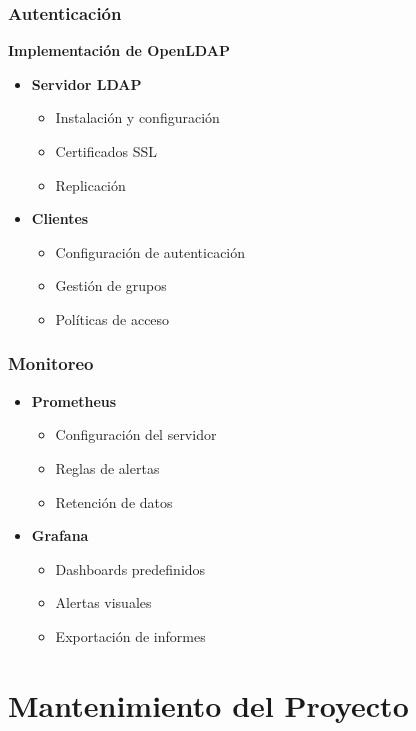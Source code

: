 \subsection{Autenticación}
\begin{infocaja}
\textbf{Implementación de OpenLDAP}
\begin{itemize}
    \item \textbf{Servidor LDAP}
    \begin{itemize}
        \item Instalación y configuración
        \item Certificados SSL
        \item Replicación
    \end{itemize}
    \item \textbf{Clientes}
    \begin{itemize}
        \item Configuración de autenticación
        \item Gestión de grupos
        \item Políticas de acceso
    \end{itemize}
\end{itemize}
\end{infocaja}

\subsection{Monitoreo}
\begin{itemize}
    \item \textbf{Prometheus}
    \begin{itemize}
        \item Configuración del servidor
        \item Reglas de alertas
        \item Retención de datos
    \end{itemize}
    \item \textbf{Grafana}
    \begin{itemize}
        \item Dashboards predefinidos
        \item Alertas visuales
        \item Exportación de informes
    \end{itemize}
\end{itemize}

\chapter{Mantenimiento del Proyecto}

